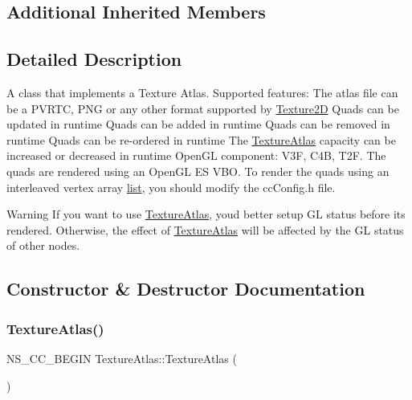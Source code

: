 \subsection*{Additional Inherited Members}


\subsection{Detailed Description}
A class that implements a Texture Atlas. Supported features\+: The atlas file can be a P\+V\+R\+TC, P\+NG or any other format supported by \hyperlink{classTexture2D}{Texture2D} Quads can be updated in runtime Quads can be added in runtime Quads can be removed in runtime Quads can be re-\/ordered in runtime The \hyperlink{classTextureAtlas}{Texture\+Atlas} capacity can be increased or decreased in runtime Open\+GL component\+: V3F, C4B, T2F. The quads are rendered using an Open\+GL ES V\+BO. To render the quads using an interleaved vertex array \hyperlink{protocollist-p}{list}, you should modify the cc\+Config.\+h file. 

\begin{DoxyWarning}{Warning}
If you want to use \hyperlink{classTextureAtlas}{Texture\+Atlas}, you\textquotesingle{}d better setup GL status before it\textquotesingle{}s rendered. Otherwise, the effect of \hyperlink{classTextureAtlas}{Texture\+Atlas} will be affected by the GL status of other nodes. 
\end{DoxyWarning}


\subsection{Constructor \& Destructor Documentation}
\mbox{\label{classTextureAtlas_aa1c27b7bd19453c4c84f1aa8993450ec}} 
\subsubsection{\texorpdfstring{Texture\+Atlas()}{TextureAtlas()}\hspace{0.1cm}{\footnotesize\ttfamily [1/2]}}
{\footnotesize\ttfamily N\+S\+\_\+\+C\+C\+\_\+\+B\+E\+G\+IN Texture\+Atlas\+::\+Texture\+Atlas (\begin{DoxyParamCaption}{ }\end{DoxyParamCaption})}

